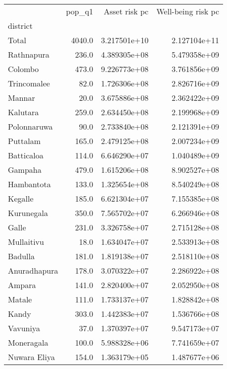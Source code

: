 \begin{tabular}{lrrr}
\toprule
{} &  pop\_q1 &  Asset risk pc &  Well-being risk pc \\
district     &         &                &                     \\
\midrule
Total        &  4040.0 &   3.217501e+10 &        2.127104e+11 \\
Rathnapura   &   236.0 &   4.389305e+08 &        5.479358e+09 \\
Colombo      &   473.0 &   9.226773e+08 &        3.761856e+09 \\
Trincomalee  &    82.0 &   1.726306e+08 &        2.826716e+09 \\
Mannar       &    20.0 &   3.675886e+08 &        2.362422e+09 \\
Kalutara     &   259.0 &   2.634450e+08 &        2.199968e+09 \\
Polonnaruwa  &    90.0 &   2.733840e+08 &        2.121391e+09 \\
Puttalam     &   165.0 &   2.479125e+08 &        2.007234e+09 \\
Batticaloa   &   114.0 &   6.646290e+07 &        1.040489e+09 \\
Gampaha      &   479.0 &   1.615206e+08 &        8.902527e+08 \\
Hambantota   &   133.0 &   1.325654e+08 &        8.540249e+08 \\
Kegalle      &   185.0 &   6.621304e+07 &        7.155385e+08 \\
Kurunegala   &   350.0 &   7.565702e+07 &        6.266946e+08 \\
Galle        &   231.0 &   3.326758e+07 &        2.715128e+08 \\
Mullaitivu   &    18.0 &   1.634047e+07 &        2.533913e+08 \\
Badulla      &   181.0 &   1.819138e+07 &        2.518110e+08 \\
Anuradhapura &   178.0 &   3.070322e+07 &        2.286922e+08 \\
Ampara       &   141.0 &   2.820400e+07 &        2.052950e+08 \\
Matale       &   111.0 &   1.733137e+07 &        1.828842e+08 \\
Kandy        &   303.0 &   1.442383e+07 &        1.536766e+08 \\
Vavuniya     &    37.0 &   1.370397e+07 &        9.547173e+07 \\
Moneragala   &   100.0 &   5.988328e+06 &        7.741659e+07 \\
Nuwara Eliya &   154.0 &   1.363179e+05 &        1.487677e+06 \\
\bottomrule
\end{tabular}
